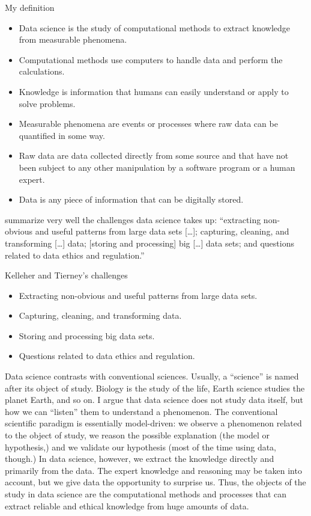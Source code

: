 \begin{mainbox}{My definition}
  \begin{itemize}
    \item Data science is the study of computational methods to extract knowledge from
      measurable phenomena.
    \item Computational methods use computers to handle data and perform the calculations.
    \item Knowledge is information that humans can easily understand or apply to solve
      problems.
    \item Measurable phenomena are events or processes where raw data can be quantified
      in some way.
    \item Raw data are data collected directly from some source and that have not been
      subject to any other manipulation by a software program or a human expert.
    \item Data is any piece of information that can be digitally stored.
  \end{itemize}
\end{mainbox}

\textcite{Kelleher2018} summarize very well the challenges data science takes up:
``extracting non-obvious and useful patterns from large data sets [\dots]; capturing,
cleaning, and transforming [\dots] data; [storing and processing] big [\dots] data sets;
and questions related to data ethics and regulation.''

\begin{mainbox}{Kelleher and Tierney's challenges}
  \begin{itemize}
    \item Extracting non-obvious and useful patterns from large data sets.
    \item Capturing, cleaning, and transforming data.
    \item Storing and processing big data sets.
    \item Questions related to data ethics and regulation.
  \end{itemize}
\end{mainbox}

Data science contrasts with conventional sciences.  Usually, a ``science'' is named after
its object of study.  Biology is the study of the life, Earth science studies the planet
Earth, and so on.  I argue that data science does not study data itself, but how we can
``listen'' them to understand a phenomenon.  The conventional scientific paradigm is
essentially model-driven: we observe a phenomenon related to the object of study, we
reason the possible explanation (the model or hypothesis,) and we validate our hypothesis
(most of the time using data, though.)  In data science, however, we extract the knowledge
directly and primarily from the data.  The expert knowledge and reasoning may be taken
into account, but we give data the opportunity to surprise us.  Thus, the objects of the
study in data science are the computational methods and processes that can extract
reliable and ethical knowledge from huge amounts of data.

